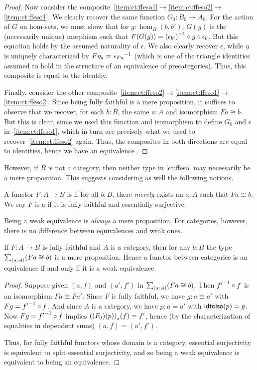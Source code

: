 \begin{proof}
  Now consider the composite~\ref{item:ct:ffeso1}$\to$\ref{item:ct:ffeso2}$\to$\ref{item:ct:ffeso1}.
  We clearly recover the same function $G_0:B_0 \to A_0$.
  For the action of $G$ on hom-sets, we must show that for $g:\hom_B(b,b')$, $G(g)$ is the (necessarily unique) morphism such that $F(G(g)) = {(\epsilon_{b'})}^{-1}\circ g \circ \epsilon_b$.
  But this equation holds by the assumed naturality of $\epsilon$.
  We also clearly recover $\epsilon$, while $\eta$ is uniquely characterized by $F\eta_a =_{} {\epsilon_{Fa}}^{-1}$ (which is one of the triangle identities assumed to hold in the structure of an equivalence of precategories).
  Thus, this composite is equal to the identity.

  Finally, consider the other composite~\ref{item:ct:ffeso2}$\to$\ref{item:ct:ffeso1}$\to$\ref{item:ct:ffeso2}.
  Since being fully faithful is a mere proposition, it suffices to observe that we recover, for each $b:B$, the same $a:A$ and isomorphism $F a \cong b$.
  But this is clear, since we used this function and isomorphism to define $G_0$ and $\epsilon$ in~\ref{item:ct:ffeso1}, which in turn are precisely what we used to recover~\ref{item:ct:ffeso2} again.
  Thus, the composites in both directions are equal to identities, hence we have an equivalence \eqv{\ref{item:ct:ffeso1}}{\ref{item:ct:ffeso2}}.
\end{proof}

However, if $B$ is not a category, then neither type in \autoref{ct:ffeso} may necessarily be a mere proposition.
This suggests considering as well the following notions.

\begin{defn}
  A functor $F:A\to B$ is  if for all $b:B$, there \emph{merely} exists an $a:A$ such that $Fa\cong b$.
  We say $F$ is a  if it is fully faithful and essentially surjective.
\end{defn}

Being a weak equivalence is \emph{always} a mere proposition.
For categories, however, there is no difference between equivalences and weak ones.

\begin{lem}\label{ct:catweq}
  If $F:A\to B$ is fully faithful and $A$ is a category, then for any $b:B$ the type $\sm{a:A} (Fa\cong b)$ is a mere proposition.
  Hence a functor between categories is an equivalence if and only if it is a weak equivalence.
\end{lem}
\begin{proof}
  Suppose given $(a,f)$ and $(a',f')$ in $\sm{a:A} (Fa\cong b)$.
  Then ${f'}^{-1}\circ f$ is an isomorphism $Fa \cong Fa'$.
  Since $F$ is fully faithful, we have $g:a\cong a'$ with $Fg = {f'}^{-1}\circ f$.
  And since $A$ is a category, we have $p:a=a'$ with $\mathsf{idtoiso}(p)=g$.
  Now $Fg = {f'}^{-1}\circ f$ implies ${({(F_0)}\mathopen{}\left({p}\right)\mathclose{})}_{*}\mathopen{}\left({f}\right)\mathclose{} = f'$, hence (by the characterization of equalities in dependent sums) $(a,f)=(a',f')$.

  Thus, for fully faithful functors whose domain is a category, essential surjectivity is equivalent to split essential surjectivity, and so being a weak equivalence is equivalent to being an equivalence.
\end{proof}


